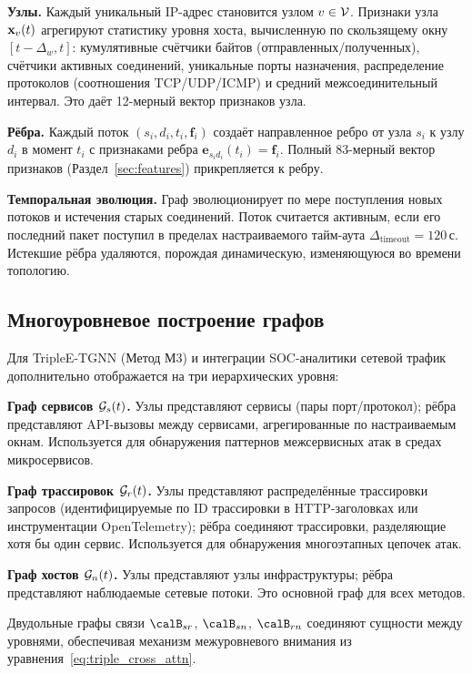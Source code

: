 \noindent\textbf{Узлы.} Каждый уникальный IP-адрес становится узлом $v\in\mathcal{V}$. Признаки узла $\mathbf{x}_v(t)$ агрегируют статистику уровня хоста, вычисленную по скользящему окну $[t-\Delta_w, t]$: кумулятивные счётчики байтов (отправленных/полученных), счётчики активных соединений, уникальные порты назначения, распределение протоколов (соотношения TCP/UDP/ICMP) и средний межсоединительный интервал. Это даёт 12-мерный вектор признаков узла.

\noindent\textbf{Рёбра.} Каждый поток $(s_i, d_i, t_i, \mathbf{f}_i)$ создаёт направленное ребро от узла $s_i$ к узлу $d_i$ в момент $t_i$ с признаками ребра $\mathbf{e}_{s_id_i}(t_i) = \mathbf{f}_i$. Полный 83-мерный вектор признаков (Раздел~\ref{sec:features}) прикрепляется к ребру.

\noindent\textbf{Темпоральная эволюция.} Граф эволюционирует по мере поступления новых потоков и истечения старых соединений. Поток считается активным, если его последний пакет поступил в пределах настраиваемого тайм-аута $\Delta_{\mathrm{timeout}}=120$\,с. Истекшие рёбра удаляются, порождая динамическую, изменяющуюся во времени топологию.

\subsection{Многоуровневое построение графов}

Для TripleE-TGNN (Метод М3) и интеграции SOC-аналитики сетевой трафик дополнительно отображается на три иерархических уровня:

\noindent\textbf{Граф сервисов $\mathcal{G}_s(t)$.} Узлы представляют сервисы (пары порт/протокол); рёбра представляют API-вызовы между сервисами, агрегированные по настраиваемым окнам. Используется для обнаружения паттернов межсервисных атак в средах микросервисов.

\noindent\textbf{Граф трассировок $\mathcal{G}_r(t)$.} Узлы представляют распределённые трассировки запросов (идентифицируемые по ID трассировки в HTTP-заголовках или инструментации OpenTelemetry); рёбра соединяют трассировки, разделяющие хотя бы один сервис. Используется для обнаружения многоэтапных цепочек атак.

\noindent\textbf{Граф хостов $\mathcal{G}_n(t)$.} Узлы представляют узлы инфраструктуры; рёбра представляют наблюдаемые сетевые потоки. Это основной граф для всех методов.

\noindent Двудольные графы связи $\calB_{sr}$, $\calB_{sn}$, $\calB_{rn}$ соединяют сущности между уровнями, обеспечивая механизм межуровневого внимания из уравнения~\eqref{eq:triple_cross_attn}.


